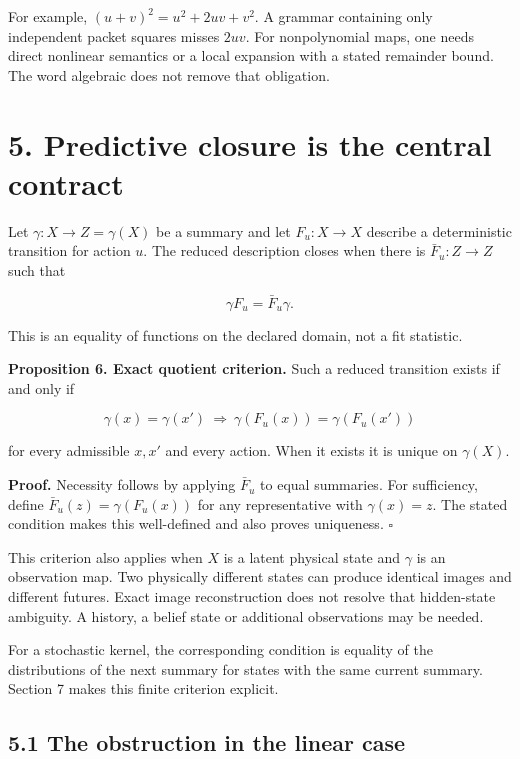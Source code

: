 \documentclass[11pt,letterpaper]{article}
\begin{document}
For example, \((u+v)^2=u^2+2uv+v^2\). A grammar containing only
independent packet squares misses \(2uv\). For nonpolynomial maps, one
needs direct nonlinear semantics or a local expansion with a stated
remainder bound. The word algebraic does not remove that obligation.

\section{5. Predictive closure is the central
contract}\label{predictive-closure-is-the-central-contract}

Let \(\gamma:X\to Z=\gamma(X)\) be a summary and let \(F_u:X\to X\)
describe a deterministic transition for action \(u\). The reduced
description closes when there is \(\bar F_u:Z\to Z\) such that

\[
\gamma F_u=\bar F_u\gamma.
\]

This is an equality of functions on the declared domain, not a fit
statistic.

\textbf{Proposition 6. Exact quotient criterion.} Such a reduced
transition exists if and only if

\[
\gamma(x)=\gamma(x')\ \Longrightarrow\
\gamma(F_u(x))=\gamma(F_u(x'))
\]

for every admissible \(x,x'\) and every action. When it exists it is
unique on \(\gamma(X)\).

\textbf{Proof.} Necessity follows by applying \(\bar F_u\) to equal
summaries. For sufficiency, define \(\bar F_u(z)=\gamma(F_u(x))\) for
any representative with \(\gamma(x)=z\). The stated condition makes this
well-defined and also proves uniqueness. \(\square\)

This criterion also applies when \(X\) is a latent physical state and
\(\gamma\) is an observation map. Two physically different states can
produce identical images and different futures. Exact image
reconstruction does not resolve that hidden-state ambiguity. A history,
a belief state or additional observations may be needed.

For a stochastic kernel, the corresponding condition is equality of the
distributions of the next summary for states with the same current
summary. Section 7 makes this finite criterion explicit.

\subsection{5.1 The obstruction in the linear
case}\label{the-obstruction-in-the-linear-case}
\end{document}
